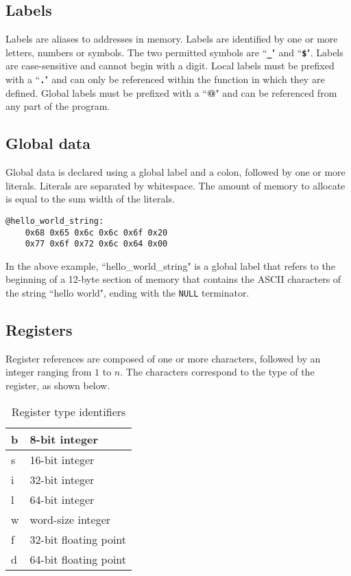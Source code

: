\subsection{Labels}

Labels are aliases to addresses in memory.
Labels are identified by
one or more letters, numbers or symbols. The two
permitted symbols are ``{\LARGE \textbf{\texttt{\_}}}" and ``\textbf{\texttt{\$}}".
Labels are case-sensitive and cannot begin with a digit.
Local labels must be prefixed with a ``\textbf{\texttt{.}}"
and can only be referenced within the function in which they are defined.
Global labels must be prefixed with a ``\textbf{\textbf{@}}"
and can be referenced from any part of the program.

\subsection{Global data}

Global data is declared using a global label and a colon, followed by one or more
literals. Literals are separated by whitespace. The amount of memory to allocate
is equal to the sum width of the literals.

\begin{verbatim}
@hello_world_string:
    0x68 0x65 0x6c 0x6c 0x6f 0x20
    0x77 0x6f 0x72 0x6c 0x64 0x00
\end{verbatim}

In the above example, ``hello\_world\_string" is a global label that refers
to the beginning of a 12-byte section of memory that contains
the ASCII characters of the string ``hello world", ending with the \texttt{NULL} terminator.

\subsection{Registers}

Register references are composed of one or more characters, followed by an integer
ranging from $1$ to $n$. The characters correspond to the type of the register, as shown below.

\begin{table}[h!]
  \begin{center}
    \begin{tabular}{|l|l|}
      \hline
      b & 8-bit integer         \\ \hline
      s & 16-bit integer        \\ \hline
      i & 32-bit integer        \\ \hline
      l & 64-bit integer        \\ \hline
      w & word-size integer     \\ \hline
      f & 32-bit floating point \\ \hline
      d & 64-bit floating point \\ \hline
    \end{tabular}
  \end{center}
  \caption{Register type identifiers}
\end{table}

